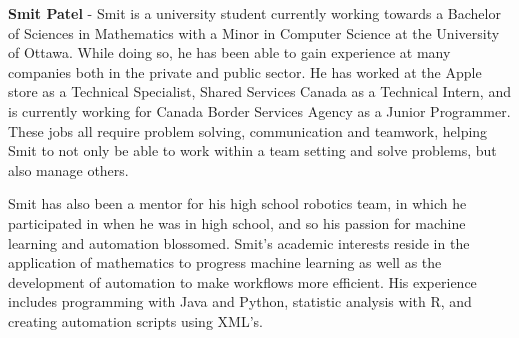 \textbf{Smit Patel} - Smit is a university student currently working towards a Bachelor of Sciences in Mathematics with a Minor in Computer Science at the University of Ottawa. While doing so, he has been able to gain experience at many companies both in the private and public sector. He has worked at the Apple store as a Technical Specialist, Shared Services Canada as a Technical Intern, and is currently working for Canada Border Services Agency as a Junior Programmer. These jobs all require problem solving, communication and teamwork, helping Smit to not only be able to work within a team setting and solve problems, but also manage others. \par Smit has also been a mentor for his high school robotics team, in which he participated in when he was in high school, and so his passion for machine learning and automation blossomed. Smit’s academic interests reside in the application of mathematics to progress machine learning as well as the development of automation to make workflows more efficient. His experience includes programming with Java and Python, statistic analysis with R, and creating automation scripts using XML’s.